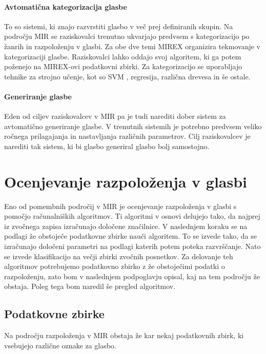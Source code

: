 \documentclass[a4paper, 12pt]{book}
\begin{document}
{\paragraph{Avtomatična kategorizacija glasbe}

To so sistemi, ki znajo razvrstiti glas\-bo v več prej definiranih skupin. Na področju MIR se raziskovalci trenutno ukvarjajo predvsem s kategorizacijo po žanrih in razpoloženju v glasbi. Za obe dve temi MIREX organizira tekmovanje v kategorizaciji glasbe. Raziskovalci lahko oddajo svoj algoritem, ki ga potem poženejo na MIREX-ovi podatkovni zbirki. Za kategorizacijo se uporabljajo tehnike za strojno učenje, kot so SVM \cite{ben2010user}, regresija, različna drevesa in še ostale.

\paragraph{Generiranje glasbe}

Eden od ciljev raziskovalcev v MIR pa je tudi narediti dober sistem za avtomatično generiranje glasbe. V trenutnih sistemih je potrebno predvsem veliko ročnega prilagajanja in nastavljanja različnih parametrov. Cilj raziskovalcev je narediti tak sistem, ki bi glasbo generiral glasbo bolj samostojno.



\section{Ocenjevanje razpoloženja v glasbi}

Eno od pomembnih področij v MIR je ocenjevanje razpoloženja v glasbi s pomočjo računalniških algoritmov. Ti algoritmi v osnovi delujejo tako, da najprej iz zvočnega zapisa izračunajo določene značilnice. V naslednjem koraku se na podlagi že obstoječe podatkovne zbirke nauči algoritem. To se izvede tako, da se izračunajo določeni parametri na podlagi katerih potem poteka razvrščanje. Nato se izvede klasifikacijo na večji zbirki zvočnih posnetkov. Za delovanje teh algoritmov potrebujemo podatkovno zbirko z že obstoječimi podatki o razpoloženju, zato bom v naslednjem podpoglavju opisal, kaj na tem področju že obstaja. Poleg tega bom naredil še pregled algoritmov.

\subsection{Podatkovne zbirke}

Na področju razpoloženja v MIR obstaja že kar nekaj podatkovnih zbirk, ki vsebujejo različne oznake za glasbo. 

}
\end{document}
